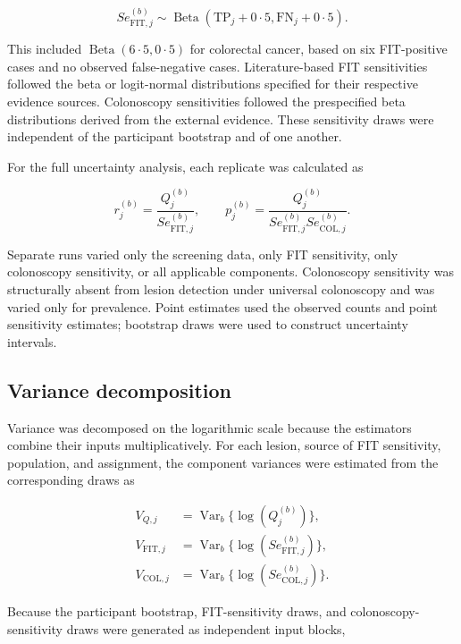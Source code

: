 \documentclass[10pt,a4paper]{article}
\newcommand{\Se}{\mathit{Se}}
\newcommand{\BetaDist}{\operatorname{Beta}}
\newcommand{\dec}{\ensuremath{\cdot}}
\begin{document}
\begin{equation*}
\Se_{\mathrm{FIT},j}^{(b)}
\sim
\BetaDist(\mathrm{TP}_j+0\dec{}5,\mathrm{FN}_j+0\dec{}5).
\end{equation*}

This included $\BetaDist(6\dec{}5,0\dec{}5)$ for colorectal cancer, based on
six FIT-positive cases and no observed false-negative cases.
Literature-based FIT sensitivities followed the beta or logit-normal
distributions specified for their respective evidence sources. Colonoscopy
sensitivities followed the prespecified beta distributions derived from the
external evidence. These sensitivity draws were independent of the
participant bootstrap and of one another.

For the full uncertainty analysis, each replicate was calculated as

\begin{equation*}
r_j^{(b)}
=
\frac{Q_j^{(b)}}{\Se_{\mathrm{FIT},j}^{(b)}},
\qquad
p_j^{(b)}
=
\frac{Q_j^{(b)}}
{\Se_{\mathrm{FIT},j}^{(b)}
 \Se_{\mathrm{COL},j}^{(b)}}.
\end{equation*}

Separate runs varied only the screening data, only FIT sensitivity, only
colonoscopy sensitivity, or all applicable components. Colonoscopy sensitivity
was structurally absent from lesion detection under universal colonoscopy and
was varied only for prevalence. Point estimates used the observed counts and
point sensitivity estimates; bootstrap draws were used to construct
uncertainty intervals.

\subsection*{Variance decomposition}

Variance was decomposed on the logarithmic scale because the estimators combine
their inputs multiplicatively. For each lesion, source of FIT sensitivity,
population, and assignment, the component variances were estimated from the
corresponding draws as

\begin{align*}
V_{Q,j}
&=\operatorname{Var}_b\{\log(Q_j^{(b)})\},
\\
V_{\mathrm{FIT},j}
&=\operatorname{Var}_b
\{\log(\Se_{\mathrm{FIT},j}^{(b)})\},
\\
V_{\mathrm{COL},j}
&=\operatorname{Var}_b
\{\log(\Se_{\mathrm{COL},j}^{(b)})\}.
\end{align*}

Because the participant bootstrap, FIT-sensitivity draws, and
colonoscopy-sensitivity draws were generated as independent input blocks,
\end{document}
